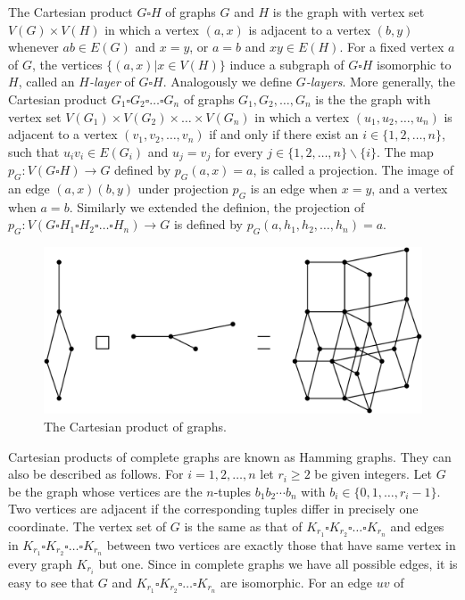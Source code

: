 \documentclass[12pt,a4paper,titlepage,openany]{report}
\begin{document}
The Cartesian product $G\square H$ of graphs $G$ and $H$ is the graph with vertex set $V(G)\times V(H)$ in which a vertex $(a,x)$ is adjacent to a vertex $(b,y)$ whenever
$ab\in E(G)$ and $x=y$, or $a=b$ and $xy\in E(H)$. For a fixed vertex $a$ of $G$, the vertices $\{(a,x)|x\in V(H)\}$ induce a subgraph of $G \square H$ isomorphic to $H$, called an \textit{$H$-layer} of $G \square H$. Analogously we define \textit{$G$-layers}.\newline
More generally, the Cartesian product $G_1\square G_2 \square \ldots \square G_n$ of graphs $G_1,G_2,\ldots, G_n$ is the the graph with vertex set $V(G_1)\times V(G_2)\times \ldots \times V(G_n)$ in which a vertex $(u_1,u_2,\ldots, u_n)$ is adjacent to a vertex $(v_1,v_2,\ldots,v_n)$ if and only if there exist an $i\in \{1,2,\ldots, n\}$, such that $u_iv_i\in E(G_i)$ and $u_j=v_j$ for every $j\in \{1,2,\ldots,n\}\backslash \{i\}$.\newline
The map $p_G:V(G\square H) \to G$ defined by $p_G(a,x)=a$, is called a projection. The image of an edge $(a,x)(b,y)$ under projection $p_G$ is an edge when $x=y$, and a vertex when $a=b$.\newline
Similarly we extended the definion, the projection of $p_G:V(G\square H_1\square H_2\square \ldots \square H_n) \to G$ is defined by $p_G(a,h_1,h_2,\ldots,h_n)=a$.
\begin{figure}[h]\label{fig:cartProduct}
\begin{center}
\includegraphics[width=0.75\linewidth]{figures/Graph-Cartesian-product.png}
\caption{The Cartesian product of graphs.}
\end{center}
\end{figure}
Cartesian products of complete graphs are known as Hamming graphs. They can also be described as follows. For
$i=1,2,\ldots, n$ let $r_i\geq 2$ be given integers. Let $G$ be the graph whose vertices are the $n$-tuples $b_1b_2\cdots b_n$ with $b_i\in \{0,1,\ldots, r_i-1\}$. Two vertices are adjacent if the corresponding tuples differ in precisely one coordinate. The vertex set of $G$ is the same as that of $K_{r_1}\square K_{r_2}\square \ldots \square K_{r_n}$ and edges in $K_{r_1}\square K_{r_2}\square \ldots \square K_{r_n}$ between two vertices are exactly those that have same vertex in every graph $K_{r_i}$ but one. Since in complete graphs we have all possible edges, it is easy to see that $G$ and $K_{r_1}\square K_{r_2}\square \ldots \square K_{r_n}$ are isomorphic. For an edge $uv$ of
\end{document}
